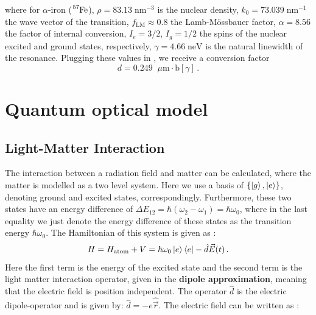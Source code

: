 where for $\alpha$-iron ($\ce{^{57}_{}Fe} $),  $\rho = 83.13 \;\mathrm{nm}^{-3}$ is the nuclear density, $k_0 = 73.039 \;\mathrm{nm}^{-1}$ the wave vector of the transition, $f_\mathrm{LM} \approx 0.8$ the Lamb-Mössbauer factor, $\alpha = 8.56$ the factor of internal conversion, $I_e = 3/2$, $I_g = 1/2$ the spins of the nuclear excited and ground states, respectively, $\gamma = 4.66 \; \mathrm{neV}$ is the natural linewidth of the resonance. Plugging these values in , we receive a conversion factor
\begin{equation}
    d = 0.249 \;\; \mu \mathrm{m} \cdot \mathrm{b}[\gamma]\label{b_conversion}\, .
\end{equation}



\section{Quantum optical model}

\subsection{Light-Matter Interaction}

The interaction between a radiation field and matter can be calculated, where the matter is modelled as a two level system. Here we use a basis of $\{\ket{g}, \ket{e}\}$, denoting ground and excited states, correspondingly. Furthermore, these two states have an energy difference of $\Delta E_{12} = \hbar (\omega_2 - \omega_1) = \hbar \omega_0$, where in the last equality we just denote the energy difference of these states as the transition energy $\hbar \omega_0$. The Hamiltonian of this system is given as \cite{bloch2004licht}:
\begin{equation} \label{timehamiltonian}
    H = H_{\textrm{atom}} + V = \hbar \omega_0 \ket{e} \bra{e} - \hat{d} \Vec{E}(t) \, . 
\end{equation}
Here the first term is the energy of the excited state and the second term is the light matter interaction operator, given in the \textbf{dipole approximation}, meaning that the electric field is position independent. The operator $\hat{d}$ is the electric dipole-operator and is given by: $\hat{d} = -e \hat{\Vec{r}}$. The electric field can be written as \cite{Scully_Zubairy_1997, reiser2014time}:

